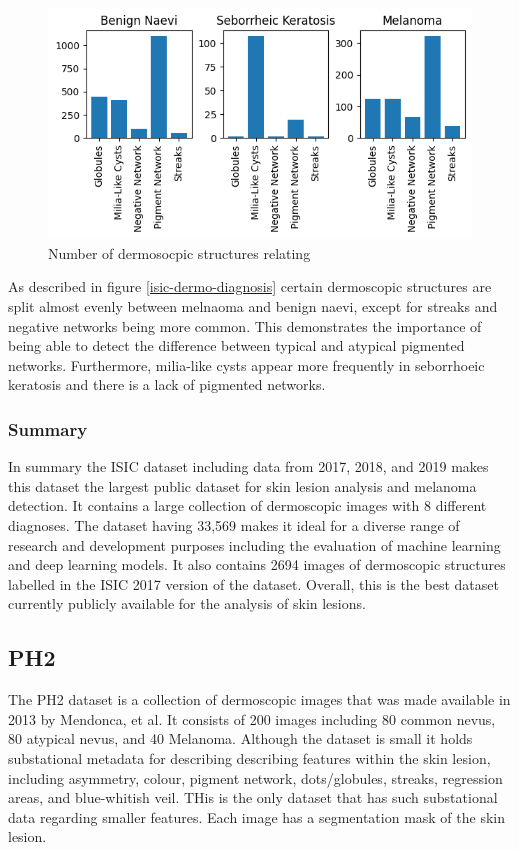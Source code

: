 \begin{figure}
	\centering
	\includegraphics[scale=0.8]{images/ISIC/isic-dermo-diagnosis.png}
	\caption{Number of dermosocpic structures relating} 
\end{figure} \label{isic-dermo-diagnosis}

As described in figure \ref{isic-dermo-diagnosis} certain dermoscopic structures are split almost evenly between melnaoma and benign naevi, except for streaks and negative networks being more common. This demonstrates the importance of being able to detect the difference between typical and atypical pigmented networks. Furthermore, milia-like cysts appear more frequently in seborrhoeic keratosis and there is a lack of pigmented networks.

\subsubsection{Summary}
In summary the ISIC dataset including data from 2017, 2018, and 2019 makes this dataset the largest public dataset for skin lesion analysis and melanoma detection. It contains a large collection of dermoscopic images with 8 different diagnoses. The dataset having 33,569 makes it ideal for a diverse range of research and development purposes including the evaluation of machine learning and deep learning models. It also contains 2694 images of dermoscopic structures labelled in the ISIC 2017 version of the dataset. Overall, this is the best dataset currently publicly available for the analysis of skin lesions.

\subsection{PH2}
The PH2 dataset is a collection of dermoscopic images that was made available in 2013 by Mendonca, et al\cite{}. It consists of 200 images including 80 common nevus, 80 atypical nevus, and 40 Melanoma. Although the dataset is small it holds substational metadata for describing describing features within the skin lesion, including asymmetry, colour, pigment network, dots/globules, streaks, regression areas, and blue-whitish veil. THis is the only dataset that has such substational data regarding smaller features. Each image has a segmentation mask of the skin lesion.

